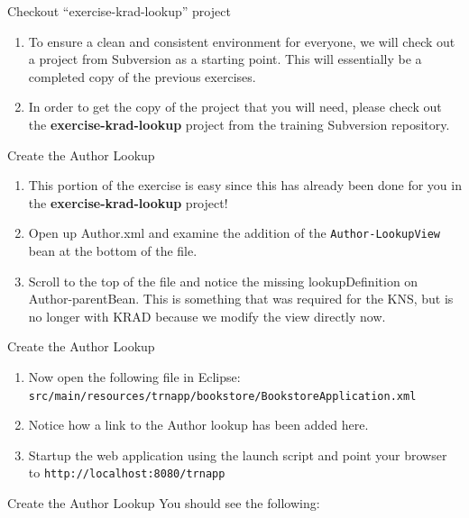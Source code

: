 \documentclass[xcolor=dvipsnames,14pt,professionalfonts]{beamer}
\begin{document}
\begin{frame}{Checkout “exercise-krad-lookup” project}
  \begin{enumerate}
    \item To ensure a clean and consistent environment for everyone, we will check out a project from Subversion as a starting point.  This will essentially be a completed copy of the previous exercises.
    \item In order to get the copy of the project that you will need,
      please check out the \textbf{exercise-krad-lookup} project from the
      training Subversion repository.
    \end{enumerate}
  \end{frame}

\begin{frame}{Create the Author Lookup}
  \begin{enumerate}
    \item This portion of the exercise is easy since this has already been done for you in the \textbf{exercise-krad-lookup} project!
    \item Open up Author.xml and examine the addition of the \texttt{Author-LookupView} bean at the bottom of the file.
    \item Scroll to the top of the file and notice the missing
      lookupDefinition on Author-parentBean. This is something that
      was required for the KNS, but is no longer with KRAD because we
      modify the view directly now.
    \end{enumerate}
  \end{frame}

\begin{frame}{Create the Author Lookup}
  \begin{enumerate}
  \item Now open the following file in Eclipse: 
    \texttt{src/main/resources/trnapp/bookstore/BookstoreApplication.xml}
  \item Notice how a link to the Author lookup has been added here.
  \item Startup the web application using the launch script and point
    your browser to \texttt{http://localhost:8080/trnapp}
    \end{enumerate}
  \end{frame}

\begin{frame}{Create the Author Lookup}
  You should see the following:
\end{frame}
\end{document}

